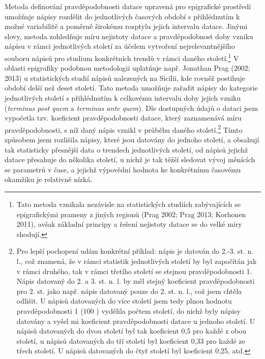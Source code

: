 Metoda definování pravděpodobnosti datace upravená pro epigrafické prostředí umožňuje nápisy rozdělit do jednotlivých časových období s přihlédnutím k možné variabilitě a poměrně širokému rozptylu jejich intervalu datace. Jinými slovy, metoda zohledňuje míru nejistoty datace a pravděpodobnost doby vzniku nápisu v rámci jednotlivých století za účelem vytvoření nejrelevantnějšího souboru nápisů pro studium konkrétních trendů v rámci daného století.\footnote{Tato metoda vznikala nezávisle na statistických studiích zabývajících se epigrafickými prameny z jiných regionů (Prag 2002; Prag 2013; Korhonen 2011), avšak základní principy a řešení nejistoty datace se do velké míry shodují.} V oblasti epigrafiky podobnou metodologii uplatňuje např. Jonathan Prag (2002; 2013) u statistických studií nápisů nalezených na Sicílii, kde rovněž postihuje období delší než deset století. Tato metoda umožňuje zařadit nápisy do kategorie jednotlivých století s přihlédnutím k celkovému intervalu doby jejich vzniku ({\em terminus post quem} a {\em terminus ante quem}). Dle dostupných údajů o dataci jsem vypočetla tzv. koeficient pravděpodobnosti datace, který zaznamenává míru pravděpodobnosti, s níž daný nápis vznikl v průběhu daného století.\footnote{Pro lepší pochopení udám konkrétní příklad: nápis je datován do 2.-3. st. n. l., což znamená, že v rámci statistik jednotlivých století by byl započítán jak v rámci druhého, tak v rámci třetího století se stejnou pravděpodobnosti 1. Nápis datovaný do 2. a 3. st. n. l. by měl stejný koeficient pravděpodobnosti pro 2. st. jako např. nápis datovaný pouze do 2. st. n. l., což jsem chtěla odlišit. U nápisů datovaných do více století jsem tedy plnou hodnotu pravděpodobnosti 1 (100 ) vydělila počtem století, do nichž byly nápisy datovány a vyšel mi koeficient pravděpodobnosti datace u jednoho století. U nápisů datovaných do dvou století byl tak koeficient 0,5 pro každé z obou století, u nápisů datovaných do tří století byl koeficient 0,33 pro každé ze třech století. U nápisů datovaných do čtyř století byl koeficient 0,25, atd.} Tímto způsobem jsem rozlišila nápisy, které jsou datovány do jednoho století, a obsahují tak statisticky přesnější data o trendech jednotlivých století, od nápisů jejichž datace přesahuje do několika století, u nichž je tak těžší sledovat vývoj měnících se parametrů v čase, a jejichž výpovědní hodnota ke konkrétnímu časovému okamžiku je relativně nízká.

